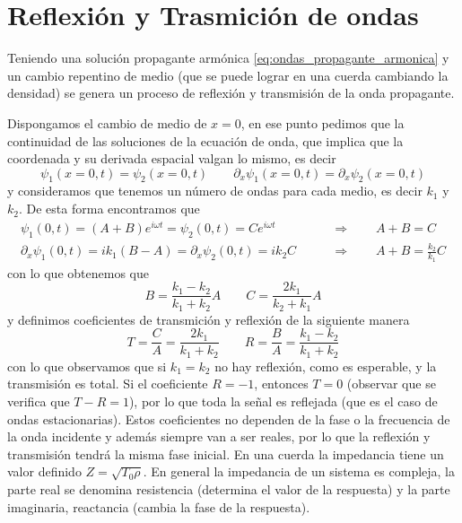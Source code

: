 \documentclass[a4paper,spanish]{article}
\numberwithin{equation}{section}
\begin{document}
\part{Reflexi\'on y Trasmici\'on de ondas}
Teniendo una soluci\'on propagante arm\'onica \ref{eq:ondas_propagante_armonica} y un cambio repentino de medio (que se puede lograr en una cuerda cambiando la densidad) se genera un proceso de reflexi\'on y transmisi\'on de la onda propagante.
			
			Dispongamos el cambio de medio de $x = 0$, en ese punto pedimos que la continuidad de las soluciones de la ecuaci\'on de onda, que implica que la coordenada y su derivada espacial valgan lo mismo, es decir
			\begin{equation*}
				\psi_1(x = 0,t) = \psi_2(x = 0,t) \qquad \partial_x \psi_1(x = 0,t) = \partial_x \psi_2(x = 0, t)
			\end{equation*}
			y consideramos que tenemos un n\'umero de ondas para cada medio, es decir $k_1$ y $k_2$. De esta forma encontramos que
			\begin{align*}
				\psi_1(0,t) = (A + B) e^{i\omega t} = \psi_2(0,t) = C e^{i\omega t} \qquad &\Rightarrow \qquad A + B = C\\
				\partial_x \psi_1(0,t) =  i k_1 (B - A) = \partial_x \psi_2(0,t) = i k_2 C \qquad &\Rightarrow \qquad A + B = \frac{k_2}{k_1} C
			\end{align*}
			con lo que obtenemos que
			\begin{equation}
				B = \frac{k_1 - k_2}{k_1 + k_2} A \qquad C = \frac{2 k_1}{k_2 + k_1} A
				\label{eq:ondas_reflexion_amplitudes}
			\end{equation}
			y definimos coeficientes de transmici\'on y reflexi\'on de la siguiente manera
			\begin{equation}
				T = \frac{C}{A} = \frac{2 k_1}{k_1 + k_2} \qquad R = \frac{B}{A} = \frac{k_1 - k_2}{k_1 + k_2}
				\label{eq:ondas_reflexion_coeficientes}
			\end{equation}
			con lo que observamos que si $k_1 = k_2$ no hay reflexi\'on, como es esperable, y la transmisi\'on es total. Si el coeficiente $R = -1$, entonces $T = 0$ (observar que se verifica que $T - R = 1$), por lo que toda la se\~nal es reflejada (que es el caso de ondas estacionarias). Estos coeficientes no dependen de la fase o la frecuencia de la onda incidente y adem\'as siempre van a ser reales, por lo que la reflexi\'on y transmisi\'on tendr\'a la misma fase inicial.
			En una cuerda la impedancia tiene un valor definido $Z = \sqrt{T_0 \rho}$. En general la impedancia de un sistema es compleja, la parte real se denomina resistencia (determina el valor de la respuesta) y la parte imaginaria, reactancia (cambia la fase de la respuesta).
			
\end{document}

